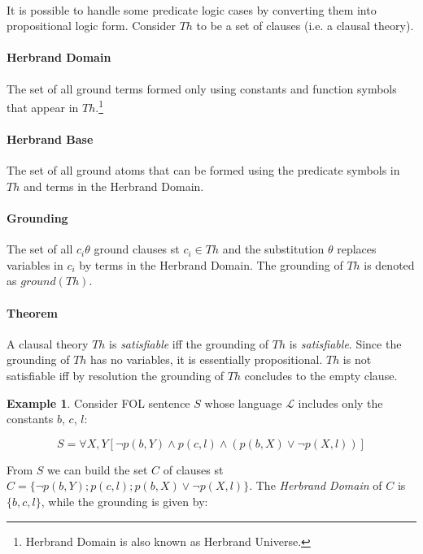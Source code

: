 \documentclass{article}
\theoremstyle{plain}
\theoremstyle{definition}
\newtheorem{exmp}[thm]{Example} %
\begin{document}
\begin{multicols}{2}
\paragraph{} It is possible to handle some predicate logic cases by converting them into propositional logic form. Consider $Th$ to be a set of clauses (i.e. a clausal theory).

\paragraph{Herbrand Domain} The set of all ground terms formed only using constants and function symbols that appear in $Th$.\footnote{Herbrand Domain is also known as Herbrand Universe.}

\paragraph{Herbrand Base} The set of all ground atoms that can be formed using the predicate symbols in $Th$ and terms in the Herbrand Domain.

\paragraph{Grounding} The set of all $c_i\theta$ ground clauses st $c_i \in Th$ and the substitution $\theta$ replaces variables in $c_i$ by terms in the Herbrand Domain. The grounding of $Th$ is denoted as $ground(Th)$.

\paragraph{Theorem} A clausal theory $Th$ is \textit{satisfiable} iff the grounding of $Th$ is \textit{satisfiable}. Since the grounding of $Th$ has no variables, it is essentially propositional. $Th$ is not satisfiable iff by resolution the grounding of $Th$ concludes to the empty clause.

\begin{exmp}\label{exmp:HerbrandTheorem} Consider FOL sentence $S$ whose language $\mathcal{L}$ includes only the constants $b$, $c$, $l$:\end{exmp}

$$S = \forall X, Y [\lnot p(b, Y) \land p(c, l) \land (p(b, X) \lor \lnot p(X, l))]$$

\noindent From $S$ we can build the set $C$ of clauses st $C = \{\lnot p(b, Y); p(c,l); p(b, X) \lor \lnot p(X, l)\}$. The \textit{Herbrand Domain} of $C$ is $\{b, c, l\}$, while the grounding is given by:


\end{multicols}
\end{document}
